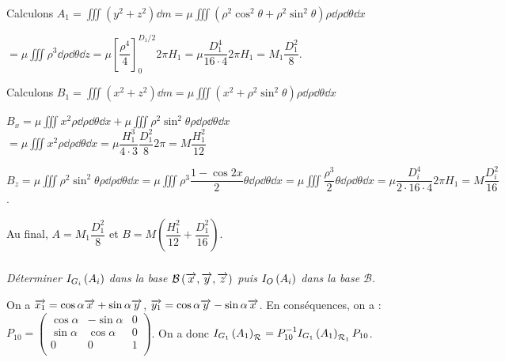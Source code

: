 \documentclass[10pt,fleqn]{article} %
\begin{document}
\begin{multicols}{2}
\begin{corrige}
Calculons $A_1 = \iiint \left(y^2+z^2\right)  \dd m=\mu \iiint \left(\rho^2\cos^2\theta +\rho^2\sin^2\theta\right) \rho \dd \rho \dd \theta \dd x  $

$ = \mu \iiint \rho^3  \dd \rho \dd \theta \dd z  = \mu \left[ \dfrac{\rho^4}{4}\right]_{0}^{D_1/2}2\pi H_1 = \mu \dfrac{D_1^4}{16\cdot 4}2\pi H_1 = M_1 \dfrac{D_1^2}{8}$.


Calculons $B_1 = \iiint \left(x^2+z^2\right)  \dd m=\mu \iiint \left(x^2 +\rho^2\sin^2\theta\right) \rho \dd \rho \dd \theta \dd x$ 

$B_x=\mu \iiint x^2  \rho \dd \rho \dd \theta \dd x+\mu \iiint \rho^2\sin^2\theta \rho \dd \rho \dd \theta \dd x  $
$=\mu \iiint x^2  \rho \dd \rho \dd \theta \dd x = \mu \dfrac{H_1^3}{4\cdot 3}\dfrac{D_1^2}{8} 2\pi  = M  \dfrac{H_1^2}{12}   $

$B_z =\mu \iiint \rho^2\sin^2\theta \rho \dd \rho \dd \theta \dd x =\mu \iiint \rho^3\dfrac{1-\cos 2x}{2}\theta  \dd \rho \dd \theta \dd x=\mu \iiint \dfrac{\rho^3}{2}\theta  \dd \rho \dd \theta \dd x =\mu \dfrac{D_i^4}{2\cdot 16\cdot 4}2 \pi H_1 =M  \dfrac{D_i^2}{16}$.

Au final, $A =M_1 \dfrac{D_1^2}{8}$ et  $B =M\left(\dfrac{H_1^2}{12} + \dfrac{D_1^2}{16} \right)$.





\end{corrige}
\else
\fi

\subparagraph{}
\textit{Déterminer $I_{G_i}\left( A_i\right)$ dans la base $\mathcal{B}\left(\overrightarrow{x},\overrightarrow{y},\overrightarrow{z} \right)$ puis 
$I_{O}\left( A_i\right)$ dans la base $\mathcal{B}$.}
\ifprof
\begin{corrige}
 On a $\overrightarrow{x_1}=\cos\alpha\overrightarrow{x}+\sin\alpha\overrightarrow{y}$, $\overrightarrow{y_1}=\cos\alpha\overrightarrow{y}-\sin\alpha\overrightarrow{x}$. 
 En conséquences, on a : 
$P_{10}=\begin{pmatrix} \cos \alpha & - \sin\alpha & 0 \\ \sin \alpha & \cos \alpha & 0 \\ 0 & 0 & 1 \\ \end{pmatrix}$. 
On a donc 
$I_{G_1}\left( A_1\right)_{\mathcal{R}_{}}=P_{10}^{-1}I_{G_1}\left( A_1\right)_{\mathcal{R}_{1}}P_{10}$. 


\end{corrige}
\end{multicols}
\end{document}

